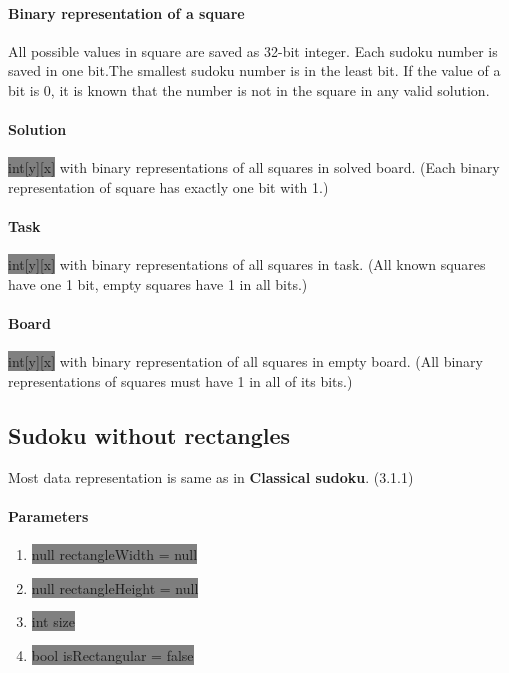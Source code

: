 \documentclass{report}
\begin{document}
\paragraph{Binary representation of a square}
All possible values in square are saved as 32-bit integer. Each sudoku number is saved in one bit.The smallest sudoku number is in the least bit. If the value of a bit is 0, it is known that the number is not in the square in any valid solution.

\paragraph{Solution}
\colorbox{gray}{int[y][x]} with binary representations of all squares in solved board. (Each binary representation of square has exactly one bit with 1.)

\paragraph{Task}
\colorbox{gray}{int[y][x]} with binary representations of all squares in task. (All known squares have one 1 bit, empty squares have 1 in all bits.)

\paragraph{Board}
\colorbox{gray}{int[y][x]} with binary representation of all squares in empty board. (All binary representations of squares must have 1 in all of its bits.)

\subsection{Sudoku without rectangles}

Most data representation is same as in \textbf{Classical sudoku}. (3.1.1)

\paragraph{Parameters}
\begin{enumerate}
    \item[] \colorbox{gray}{null rectangleWidth = null}
    \item[] \colorbox{gray}{null rectangleHeight = null}
    \item[] \colorbox{gray}{int size}
    \item[] \colorbox{gray}{bool isRectangular = false}
\end{enumerate}
\end{document}
